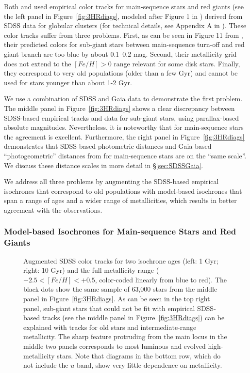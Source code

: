 Both \cite{2012ApJ...757..166B} and \cite{2014ApJ...783..114G} used empirical color tracks for main-sequence stars
and red giants (see the left panel in Figure~\ref{fig:3HRdiags}, modeled after Figure 1 in \citealt{2014ApJ...783..114G})
derived from SDSS data for globular clusters (for technical details, see
Appendix A in \citealt{2008ApJ...684..287I}). These color tracks suffer from three problems. First, as can be seen in Figure 11 from
\cite{2014ApJ...783..114G}, their predicted colors for sub-giant stars between main-sequence turn-off and red giant branch are too blue by
about 0.1--0.2 mag. Second, their metallicity grid does not extend to the $[Fe/H]>0$ range relevant for some disk stars. Finally, they
correspond to very old populations (older than a few Gyr) and cannot be used for stars younger than about 1-2 Gyr. 

We use a combination of SDSS and Gaia data to demonstrate the first problem. The middle panel in Figure~\ref{fig:3HRdiags} 
shows a clear discrepancy between SDSS-based empirical tracks and data for sub-giant stars, using parallax-based absolute
magnitudes. Nevertheless, it is noteworthy that
for main-sequence stars the agreement is excellent. Furthermore, the right panel in Figure~\ref{fig:3HRdiags} demonstrates
that SDSS-based photometric distances and Gaia-based ``photogeometric'' distances from \cite{bailer-jones_estimating_2021}
for main-sequence stars are on the ``same scale''.  We discuss these
distance scales in more detail in \S\ref{sec:SDSSGaia}. 
 
We address all three problems by augmenting the SDSS-based empirical isochrones that correspond to old
populations with model-based isochrones that span a range of ages and a wider range of metallicities, which
results in better agreement with the observations. 
 

\subsubsection{Model-based Isochrones for Main-sequence Stars and Red Giants} 
 

\begin{figure}[ht!]
\caption{Augmented SDSS color tracks for two isochrone ages (left: 1 Gyr; right: 10 Gyr) and the full metallicity range
  ($-2.5 < [Fe/H] < +0.5$, color-coded linearly from blue to red). The black dots show the same sample of 63,000 stars from the middle panel in
  Figure~\ref{fig:3HRdiags}. As can be seen in the top right panel, sub-giant stars that could not be fit with empirical
  SDSS-based tracks (see the middle panel in Figure~\ref{fig:3HRdiags}) can be explained with tracks for old stars and
  intermediate-range metallicity. The sharp feature protruding from the main locus in the middle two panels corresponds
  to most luminous and evolved high-metallicity stars. Note that diagrams in the bottom row, which do not include
  the $u$ band, show very little dependence on metallicity.}  
\label{fig:augmLocus}
\end{figure}

